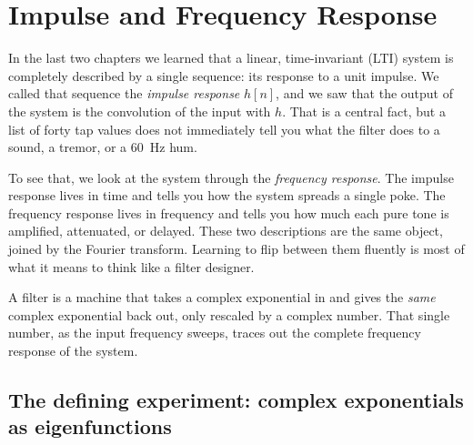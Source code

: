 \chapter{Impulse and Frequency Response}

In the last two chapters we learned that a linear, time-invariant (LTI)
system is completely described by a single sequence: its response to a unit
impulse. We called that sequence the \emph{impulse response} $h[n]$, and we
saw that the output of the system is the convolution of the input with $h$.
That is a central fact, but a list of forty tap values does not immediately tell you what the filter does to a sound, a tremor, or a 60~Hz hum.

To see that, we look at the system through the \emph{frequency response}. The impulse response lives in time and tells you how the system spreads a single poke. The frequency response lives in frequency and tells you how much each pure tone is amplified, attenuated, or delayed. These two descriptions are the same object, joined by the Fourier transform. Learning to flip between them fluently is most of what it means to think like a filter designer.

A filter is a machine that takes a complex exponential in and gives the \emph{same} complex exponential back out, only rescaled by a complex number. That single number, as the input frequency sweeps, traces out the complete frequency response of the system.

\section{The defining experiment: complex exponentials as eigenfunctions}
\label{ch14:eigen}

